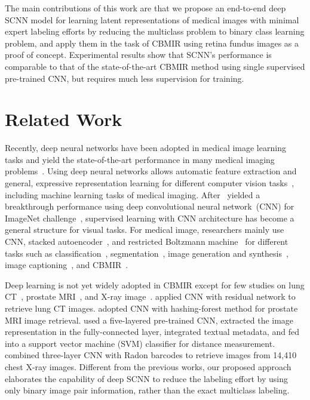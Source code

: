 \documentclass{article}
\begin{document}
The main contributions of this work are that we propose an end-to-end deep SCNN model for learning latent representations of medical images with minimal expert labeling efforts by reducing the multiclass problem to binary class learning problem, and apply them in the task of CBMIR using retina fundus images as a proof of concept. 
Experimental results show that SCNN's performance is comparable to that of the state-of-the-art CBMIR method using single supervised pre-trained CNN, but requires much less supervision for training.


\section{Related Work}
Recently, deep neural networks have been adopted in medical image learning tasks and yield the state-of-the-art performance in many medical imaging problems~\citep{litjens2017survey}.
Using deep neural networks allows automatic feature extraction and general, expressive representation learning for different computer vision tasks~\citep{bengio2013representation}, including machine learning tasks of medical imaging. 
After~\citet{krizhevsky2012imagenet} yielded a breakthrough performance using deep convolutional neural network~(CNN) for ImageNet challenge~\citep{deng2009imagenet}, supervised learning with CNN architecture has become a general structure for visual tasks. 
For medical image, researchers mainly use CNN, stacked autoencoder~\citep{cheng2016computer}, and restricted Boltzmann machine~\citep{brosch2013manifold} for different tasks such as classification~\citep{esteva2017dermatologist,gulshan2016development}, segmentation~\citep{havaei2017brain,guo2017deformable}, image generation and synthesis~\citep{nie2017medical,van2015cross}, image captioning~\citep{moradi2016cross,shin2015interleaved}, and CBMIR~\citep{sun2017using,anavi2016visualizing,liu2016generating,shah2016deeply}.

Deep learning is not yet widely adopted in CBMIR except for few studies on lung CT~\citep{sun2017using}, prostate MRI~\citep{shah2016deeply}, and X-ray image~\citep{anavi2016visualizing,liu2016generating}.
\citet{sun2017using} applied CNN with residual network to retrieve lung CT images.
\citet{shah2016deeply} adopted CNN with hashing-forest method for prostate MRI image retrieval.
\citet{anavi2016visualizing} used a five-layered pre-trained CNN, extracted the image representation in the fully-connected layer, integrated textual metadata, and fed into a support vector machine (SVM) classifier for distance measurement.
\citet{liu2016generating} combined three-layer CNN with Radon barcodes to retrieve images from 14,410 chest X-ray images.
Different from the previous works, our proposed approach elaborates the capability of deep SCNN to reduce the labeling effort by using only binary image pair information, rather than the exact multiclass labeling.
\end{document}
